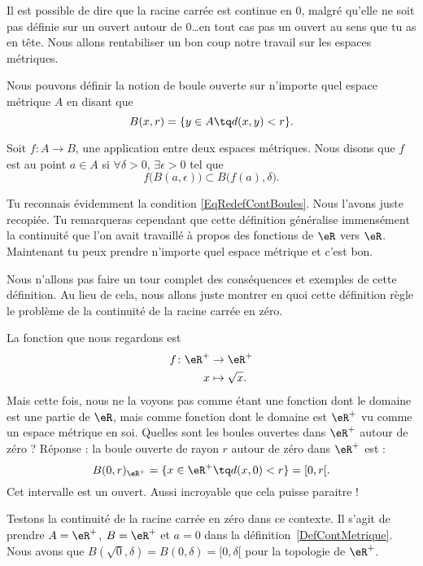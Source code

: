 Il est possible de dire que la racine carrée est continue en $0$, malgré qu'elle ne soit pas définie sur un ouvert autour de $0$\ldots en tout cas pas un ouvert au sens que tu as en tête. Nous allons rentabiliser un bon coup notre travail sur les espaces métriques.

Nous pouvons définir la notion de boule ouverte sur n'importe quel espace métrique $A$ en disant que
\[
  B(x,r)=\{ y\in A\tq d(x,y)<r \}.
\]
\begin{definition}      \label{DefContMetrique}
Soit $f\colon A\to B$, une application entre deux espaces métriques. Nous disons que $f$ est  au point $a\in A$ si $\forall \delta>0$, $\exists\epsilon>0$ tel que
\begin{equation}
  f\big( B(a,\epsilon) \big)\subset B\big( f(a),\delta \big).
\end{equation}
\end{definition}
Tu reconnais évidemment la condition \eqref{EqRedefContBoules}. Nous l'avons juste recopiée. Tu remarqueras cependant que cette définition généralise immensément la continuité que l'on avait travaillé à propos des fonctions de $\eR$ vers $\eR$. Maintenant tu peux prendre n'importe quel espace métrique et c'est bon.

Nous n'allons pas faire un tour complet des conséquences et exemples de cette définition. Au lieu de cela, nous allons juste montrer en quoi cette définition règle le problème de la continuité de la racine carrée en zéro.

La fonction que nous regardons est
\begin{equation}
\begin{aligned}
f \colon \eR^+&\to \eR^+ \\
   x&\mapsto \sqrt{x}.
\end{aligned}
\end{equation}
Mais cette fois, nous ne la voyons pas comme étant une fonction dont le domaine est une partie de $\eR$, mais comme fonction dont le domaine est $\eR^+$ vu comme un espace métrique en soi. Quelles sont les boules ouvertes dans $\eR^+$ autour de zéro ? Réponse : la boule ouverte de rayon $r$ autour de zéro dans $\eR^+$ est :
\[
  B(0,r)_{\eR^+}=\{ x\in\eR^+\tq d(x,0)<r \}=[0,r[.
\]
Cet intervalle est un ouvert. Aussi incroyable que cela puisse paraitre !

Testons la continuité de la racine carrée en zéro dans ce contexte. Il s'agit de prendre $A=\eR^+$, $B=\eR^+$ et $a=0$ dans la définition~\ref{DefContMetrique}. Nous avons que $B(\sqrt{0},\delta)=B(0,\delta)=[0,\delta[$ pour la topologie de $\eR^+$.

